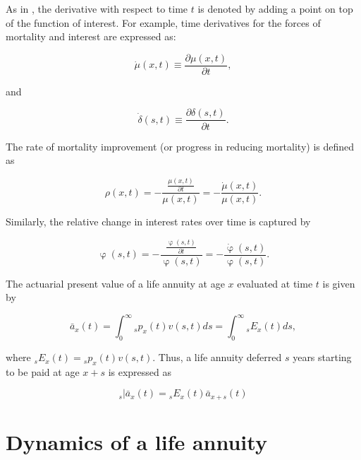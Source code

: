 \documentclass[12pt]{article}
\begin{document}
As in \citet{Vaupel2003}, the derivative with respect to time $t$ is denoted by adding a point on top of the function of interest. For example, time derivatives for the forces of mortality and interest are expressed as:

\begin{equation} \label{eq:mudot}
\dot{\mu}(x,t)\equiv\frac{\partial\mu(x,t)}{\partial t},
\end{equation}

and 

\begin{equation} \label{eq:mudot}
\dot{\delta}(s,t)\equiv\frac{\partial\delta(s,t)}{\partial t}.
\end{equation}



The rate of mortality improvement (or progress in reducing mortality) is defined as


\begin{equation} \label{eq:rho}
\rho(x,t)=-\frac{\frac{\mu(x,t)}{\partial t}}{\mu(x,t)} = - \frac{\dot{\mu}(x,t)}{\mu(x,t)}.
\end{equation}

Similarly, the relative change in interest rates over time is captured by 


\begin{equation} \label{eq:phi}
\upvarphi(s,t)=-\frac{\frac{\upvarphi(s,t)}{\partial t}}{\upvarphi(s,t)} = - \frac{\dot{\upvarphi}(s,t)}{\upvarphi(s,t)}.
\end{equation}


The actuarial present value of a life annuity at age $x$ evaluated at time $t$ is given by

\begin{equation}\label{eq:Annuity}
\bar{a}_x(t) = \int_0^\infty {}_sp_x(t) {v}(s,t)ds = \int_0^\infty {}_sE_x(t) ds,
\end{equation}

where ${}_sE_x(t)={}_sp_x(t) {v}(s,t)$. Thus, a life annuity deferred $s$ years starting to be paid at age $x+s$ is expressed as


\begin{equation}\label{eq:DefAnnuity}
{}_s|\bar{a}_x(t) = {}_sE_x(t) \bar{a}_{x+s}(t)
\end{equation}


\section{Dynamics of a life annuity}
\end{document}
